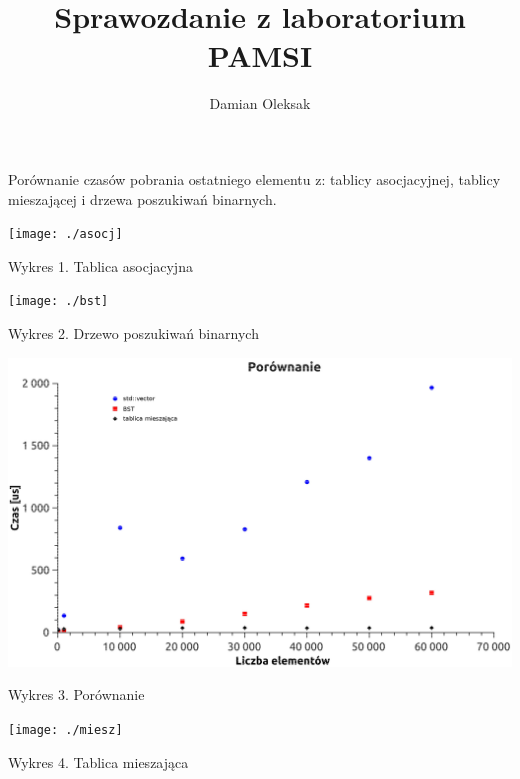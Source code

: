 \documentclass[12pt,a4paper]{article}
\title{Sprawozdanie z laboratorium PAMSI}
\author{Damian Oleksak}
\date{}
\begin{document}
\maketitle
\newpage

\begin{center}
Porównanie czasów pobrania ostatniego elementu z: tablicy asocjacyjnej, tablicy mieszającej i drzewa poszukiwań binarnych.\newline
\newline
\newline
\end{center}


\texttt{[image: ./asocj]}

Wykres 1. Tablica asocjacyjna \newpage


\texttt{[image: ./bst]}

Wykres 2. Drzewo poszukiwań binarnych \newpage

\includegraphics[scale=0.7]{./zb}

Wykres 3. Porównanie \newpage

\texttt{[image: ./miesz]}

Wykres 4. Tablica mieszająca
\end{document}
